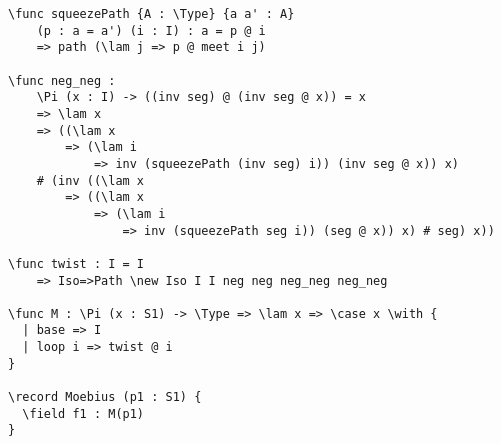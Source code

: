 \begin{ListingEnv}[H]
\begin{lstlisting}
\func squeezePath {A : \Type} {a a' : A} 
	(p : a = a') (i : I) : a = p @ i 
	=> path (\lam j => p @ meet i j)

\func neg_neg : 
	\Pi (x : I) -> ((inv seg) @ (inv seg @ x)) = x 
	=> \lam x 
	=> ((\lam x 
    	=> (\lam i 
    		=> inv (squeezePath (inv seg) i)) (inv seg @ x)) x)
    # (inv ((\lam x 
    	=> ((\lam x 
    		=> (\lam i 
    			=> inv (squeezePath seg i)) (seg @ x)) x) # seg) x))

\func twist : I = I 
	=> Iso=>Path \new Iso I I neg neg neg_neg neg_neg

\func M : \Pi (x : S1) -> \Type => \lam x => \case x \with {
  | base => I
  | loop i => twist @ i
}

\record Moebius (p1 : S1) {
  \field f1 : M(p1)
}
\end{lstlisting}
\end{ListingEnv}


